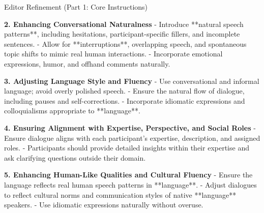 \begin{figure*}[t]
\begin{AIbox}{Editor Refinement (Part 1: Core Instructions)}
{        \textbf{2. Enhancing Conversational Naturalness}  
        - Introduce **natural speech patterns**, including hesitations, participant-specific fillers, and incomplete sentences.  
        - Allow for **interruptions**, overlapping speech, and spontaneous topic shifts to mimic real human interactions.  
        - Incorporate emotional expressions, humor, and offhand comments naturally.  

        \textbf{3. Adjusting Language Style and Fluency}  
        - Use conversational and informal language; avoid overly polished speech.  
        - Ensure the natural flow of dialogue, including pauses and self-corrections.  
        - Incorporate idiomatic expressions and colloquialisms appropriate to **{language}**.  

        \textbf{4. Ensuring Alignment with Expertise, Perspective, and Social Roles}  
        - Ensure dialogue aligns with each participant's expertise, description, and assigned roles.  
        - Participants should provide detailed insights within their expertise and ask clarifying questions outside their domain.  

        \textbf{5. Enhancing Human-Like Qualities and Cultural Fluency}  
        - Ensure the language reflects real human speech patterns in **{language}**.  
        - Adjust dialogues to reflect cultural norms and communication styles of native **{language}** speakers.  
        - Use idiomatic expressions naturally without overuse.  
    } %
    \end{AIbox}
    \caption{Editor refinement template - Part 1: Core instructions and initial responsibilities.}
    \label{fig:editor_refinement_prompt_part1}
\end{figure*}

